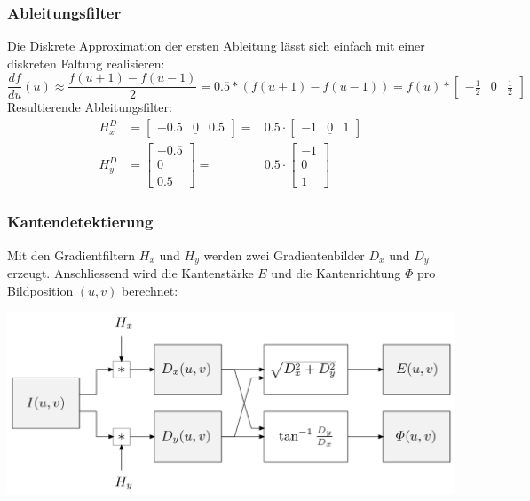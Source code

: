 \documentclass[10pt]{article}
\begin{document}
\subsubsection{Ableitungsfilter}
Die Diskrete Approximation der ersten Ableitung lässt sich einfach mit einer diskreten Faltung realisieren:
\begin{equation*}
	\frac{df}{du} (u) \approx \frac{f(u+1) - f(u-1)}{2} = 0.5 * (f(u+1) - f(u-1)) = f(u)*\begin{bmatrix}
	-\frac{1}{2} & 0 & \frac{1}{2}
	\end{bmatrix}
\end{equation*}
Resultierende Ableitungsfilter:
\begin{align*}
	H^D_x &= \begin{bmatrix} -0.5 & \underline{0} & 0.5\end{bmatrix} = &0.5 \cdot \begin{bmatrix} -1 & \underline{0} & 1\end{bmatrix} \\
	H^D_y &= \begin{bmatrix} -0.5 \\ \underline{0} \\ 0.5\end{bmatrix} = &0.5 \cdot \begin{bmatrix} -1 \\ \underline{0} \\ 1\end{bmatrix}
\end{align*}

\subsubsection{Kantendetektierung}
Mit den Gradientfiltern $H_x$ und $H_y$ werden zwei Gradientenbilder $D_x$ und $D_y$ erzeugt. Anschliessend wird die Kantenstärke $E$ und die Kantenrichtung $\Phi$ pro Bildposition $(u, v)$ berechnet:
\begin{center}
	\includegraphics[scale=0.3]{gradient-dedektierung.png}
\end{center}
\end{document}
